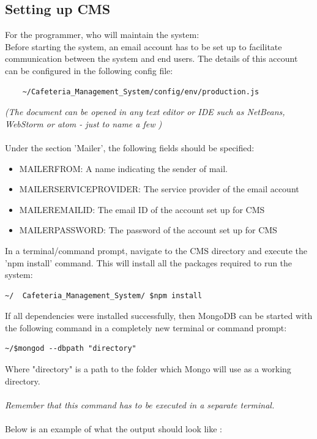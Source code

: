 \documentclass[a4paper,12pt]{article}
\begin{document}
\subsection{Setting up CMS}
For the programmer, who will maintain the system: \\
Before starting the system, an email account has to be set up to facilitate communication between the system and end users. The details of this account can be configured in the following config file:
\begin{verbatim}
	~/Cafeteria_Management_System/config/env/production.js
\end{verbatim} 
{\em (The document can be opened in any text editor or IDE  such as NetBeans, WebStorm or atom - just to name a few )}
\\ \\
Under the section 'Mailer', the following fields should be specified:\\
\begin{itemize}
\item MAILER\textunderscore FROM: A name indicating the sender of mail.
\item MAILER\textunderscore SERVICE\textunderscore PROVIDER: The service provider of the email account
\item MAILER\textunderscore EMAIL\textunderscore ID: The email ID of the account set up for CMS
\item MAILER\textunderscore PASSWORD: The password of the account set up for CMS
\end{itemize}


In a terminal/command prompt, navigate to the CMS directory and execute the 'npm install' command. This will install all the packages required to run the system: 


\begin{verbatim}
~/  Cafeteria_Management_System/ $npm install
\end{verbatim}

If all dependencies were installed successfully, then MongoDB can be started with the following command in a completely new terminal or command prompt:
\begin{verbatim}
~/$mongod --dbpath "directory"
\end{verbatim}

Where "directory"  is a path to the folder which Mongo will use as a working directory.\\ \\
{\em Remember that this command has to be executed in a separate terminal.}\\ \\
Below is an example of what the output should look like :
\end{document}
